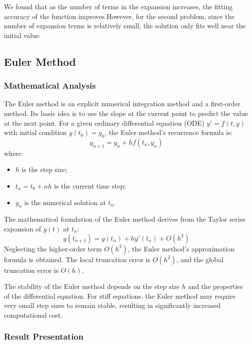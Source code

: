 \documentclass{article}
\begin{document}
We found that as the number of terms in the expansion increases, the fitting accuracy of the function improves.However, for the second problem, since the number of expansion terms is relatively small, the solution only fits well near the initial value.



\subsection{Euler Method}

\subsubsection{Mathematical Analysis}

The Euler method is an explicit numerical integration method and a first-order method. Its basic idea is to use the slope at the current point to predict the value at the next point. For a given ordinary differential equation (ODE) \( y' = f(t, y) \) with initial condition \( y(t_0) = y_0 \), the Euler method's recurrence formula is:
\[
y_{n+1} = y_n + h f(t_n, y_n)
\]
where:
\begin{itemize}
    \item \( h \) is the step size;
    \item \( t_n = t_0 + nh \) is the current time step;
    \item \( y_n \) is the numerical solution at \( t_n \).
\end{itemize}

The mathematical foundation of the Euler method derives from the Taylor series expansion of \( y(t) \) at \( t_n \):
\[
y(t_{n+1}) = y(t_n) + h y'(t_n) + O(h^2)
\]
Neglecting the higher-order term \( O(h^2) \), the Euler method's approximation formula is obtained. The local truncation error is \( O(h^2) \), and the global truncation error is \( O(h) \).

The stability of the Euler method depends on the step size \( h \) and the properties of the differential equation. For stiff equations, the Euler method may require very small step sizes to remain stable, resulting in significantly increased computational cost.

\subsubsection{Result Presentation}
\end{document}
